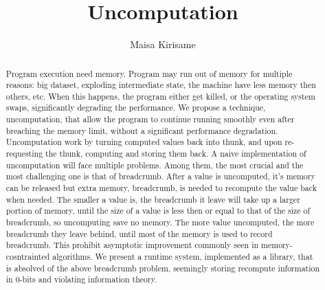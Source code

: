 \documentclass[acmsmall]{acmart}
\begin{document}
	\title{Uncomputation}
	
	\author{Maisa Kirisame}
	\authornotemark[1]
	
	\renewcommand{\shortauthors}{Kirisame et al.}
	\begin{abstract}
		Program execution need memory. Program may run out of memory for multiple reasons: big dataset, exploding intermediate state, the machine have less memory then others, etc. When this happens, the program either get killed, or the operating system swaps, significantly degrading the performance.
		We propose a technique, uncomputation, that allow the program to continue running smoothly even after breaching the memory limit, without a significant performance degradation.
		Uncomputation work by turning computed values back into thunk, and upon re-requesting the thunk, computing and storing them back.
		A naive implementation of uncomputation will face multiple problems. Among them, the most crucial and the most challenging one is that of breadcrumb. After a value is uncomputed, it's memory can be released but extra memory, breadcrumb, is needed to recompute the value back when needed.
		The smaller a value is, the breadcrumb it leave will take up a larger portion of memory, until the size of a value is less then or equal to that of the size of breadcrumb, so uncomputing save no memory.
		The more value uncomputed, the more breadcrumb they leave behind, until most of the memory is used to record breadcrumb. This prohibit asymptotic improvement commonly seen in memory-cosntrainted algorithms.
		We present a runtime system, implemented as a library, that is absolved of the above breadcrumb problem, seemingly storing recompute information in 0-bits and violating information theory.
	\end{abstract}
	
\end{document}
